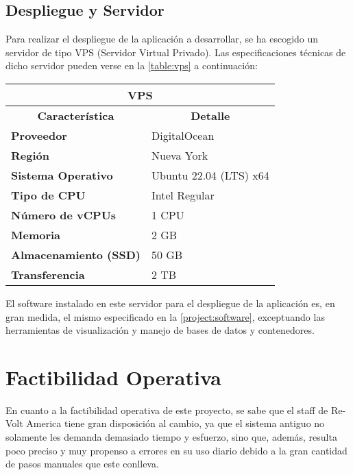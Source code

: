 \subsection{Despliegue y Servidor}
Para realizar el despliegue de la aplicación a desarrollar, se ha escogido un servidor de tipo VPS (Servidor Virtual Privado). Las especificaciones técnicas de dicho servidor pueden verse en la \autoref{table:vps} a continuación:

\begin{center}
	\begin{tabular}{ | l | p{10cm} |}
		\hline
		\multicolumn{2}{|c|}{\textbf{VPS}} \\
		\hline
		\multicolumn{1}{|c|}{\textbf{Característica}} & \multicolumn{1}{|c|}{\textbf{Detalle}} \\
		\hline
		
		{\textbf{Proveedor}} & DigitalOcean \\ \hline
		
		{\textbf{Región}} & Nueva York \\ \hline
		
		{\textbf{Sistema Operativo}} & Ubuntu 22.04 (LTS) x64 \\ \hline
		
		{\textbf{Tipo de CPU}} & Intel Regular \\ \hline
		
		{\textbf{Número de vCPUs}} & 1 CPU\\ \hline
		
		{\textbf{Memoria}} & 2 GB \\ \hline
		
		{\textbf{Almacenamiento (SSD)}} & 50 GB \\ \hline
		
		{\textbf{Transferencia}} & 2 TB \\ \hline
	\end{tabular}
  
  \label{table:vps}
\end{center}

El software instalado en este servidor para el despliegue de la aplicación es, en gran medida, el mismo especificado en la \autoref{project:software}, exceptuando las herramientas de visualización y manejo de bases de datos y contenedores.

\section{Factibilidad Operativa}
En cuanto a la factibilidad operativa de este proyecto, se sabe que el staff de Re-Volt America tiene gran disposición al cambio, ya que el sistema antiguo no solamente les demanda demasiado tiempo y esfuerzo, sino que, además, resulta poco preciso y muy propenso a errores en su uso diario debido a la gran cantidad de pasos manuales que este conlleva.

